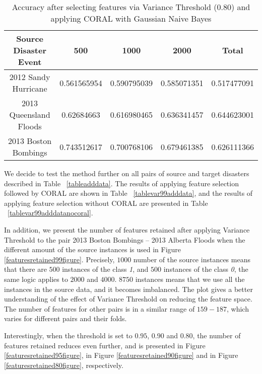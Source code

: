 \begin{table}[ht]
    \begin{center}
    \caption{Accuracy after selecting features via Variance Threshold (0.80) and applying CORAL with Gaussian Naive Bayes}
    \begin{tabular}[c]{|c|c|c|c|c|}
        \hline
        Source Disaster Event & 500 & 1000 & 2000 & Total \\
        \hline
        2012 Sandy Hurricane & 0.561565954 & 0.590795039 & 0.585071351 & 0.517477091 \\
        2013 Queensland Floods & 0.62684663 & 0.616980465 & 0.636341457 & 0.644623001 \\
        2013 Boston Bombings & 0.743512617 & 0.700768106 & 0.679461385 & 0.626111366 \\
        \hline
    \end{tabular}
    \label{tablevar8}
   \end{center}
\end{table}

We decide to test the method further on all pairs of source and target disasters described in Table ~\ref{tableadddata}. The results of applying feature selection followed by CORAL are shown in Table ~\ref{tablevar99adddata}, and the results of applying feature selection without CORAL are presented in Table ~\ref{tablevar99adddatanocoral}. 

In addition, we present the number of features retained after applying Variance Threshold to the pair 2013 Boston Bombings -- 2013 Alberta Floods when the different amount of the source instances is used in Figure \ref{featuresretained99figure}. Precisely, $1000$ number of the source instances means that there are $500$ instances of the class \textit{1}, and $500$ instances of the class \textit{0}, the same logic applies to $2000$ and $4000$. $8750$ instances means that we use all the instances in the source data, and it becomes imbalanced. The plot gives a better understanding of the effect of Variance Threshold on reducing the feature space. The number of features for other pairs is in a similar range of $159-187$, which varies for different pairs and their folds.

Interestingly, when the threshold is set to $0.95$, $0.90$ and $0.80$, the number of features retained reduces even further, and is presented in Figure \ref{featuresretained95figure}, in Figure \ref{featuresretained90figure} and in Figure \ref{featuresretained80figure}, respectively. 


